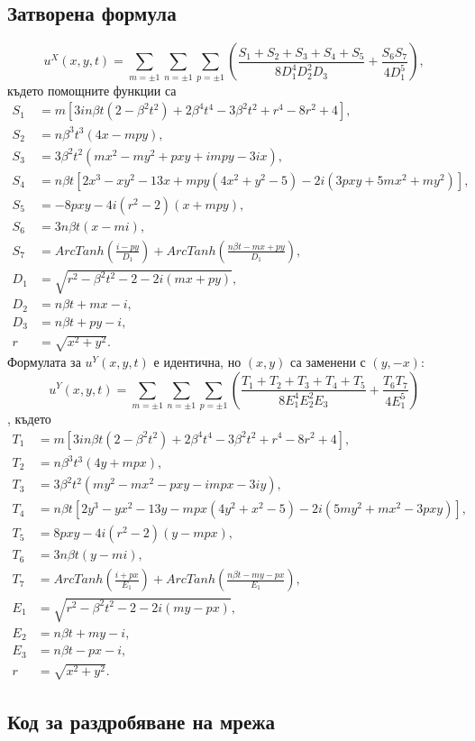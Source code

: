 \documentclass{report}
\begin{document}
	\subsection{Затворена формула}
	\[u^X(x,y,t) = \sum_{m=\pm1}\sum_{n=\pm1}\sum_{p=\pm1}(\frac{S_1+S_2+S_3+S_4+S_5}{8D_1^4D_2^2D_3}+\frac{S_6S_7}{4D_1^5}),\]
	където помощните функции са
	\begin{equation}
		\begin{aligned}
			S_1&=m[3in\beta t(2-\beta^2t^2)+2\beta^4t^4-3\beta^2t^2+r^4-8r^2+4],\\
			S_2&=n\beta^3t^3(4x-mpy),\\
			S_3&=3\beta^2t^2(mx^2-my^2+pxy+impy-3ix),\\
			S_4&=n\beta t[2x^3-xy^2-13x+mpy(4x^2+y^2-5)-2i(3pxy+5mx^2+my^2)],\\
			S_5&=-8pxy-4i(r^2-2)(x+mpy),\\
			S_6&=3n\beta t(x-mi),\\
			S_7&=ArcTanh(\frac{i-py}{D_1})+ArcTanh(\frac{n\beta t-mx+py}{D_1}),\\
			D_1&=\sqrt{r^2-\beta^2 t^2-2-2i(mx+py)},\\
			D_2&=n\beta t+mx-i,\\
			D_3&=n\beta t+py-i,\\
			r&=\sqrt{x^2+y^2}.
		\end{aligned}
	\end{equation}
	Формулата за $u^Y(x,y,t)$ е идентична, но $(x,y)$ са заменени с $(y,-x)$:\\
	\[u^Y(x,y,t)=\sum_{m=\pm1}\sum_{n=\pm1}\sum_{p=\pm1}(\frac{T_1+T_2+T_3+T_4+T_5}{8E_1^4E_2^2E_3}+\frac{T_6T_7}{4E_1^5})\], където
	\begin{equation}
		\begin{aligned}
			T_1&=m[3in\beta t(2-\beta^2t^2)+2\beta^4t^4-3\beta^2t^2+r^4-8r^2+4],\\
			T_2&=n\beta^3t^3(4y+mpx),\\
			T_3&=3\beta^2t^2(my^2-mx^2-pxy-impx-3iy),\\
			T_4&=n\beta t[2y^3-yx^2-13y-mpx(4y^2+x^2-5)-2i(5my^2+mx^2-3pxy)],\\
			T_5&=8pxy-4i(r^2-2)(y-mpx),\\
			T_6&=3n\beta t(y-mi),\\
			T_7&=ArcTanh(\frac{i+px}{E_1})+ArcTanh(\frac{n\beta t-my-px}{E_1}),\\
			E_1&=\sqrt{r^2-\beta^2t^2-2-2i(my-px)},\\
			E_2&=n\beta t+my-i,\\
			E_3&=n\beta t-px-i,\\
			r&=\sqrt{x^2+y^2}.
		\end{aligned}
	\end{equation}
	
	\subsection{Код за раздробяване на мрежа}\label{sec:mesh_refinement}
	
	
	
	
	
	
\end{document}
